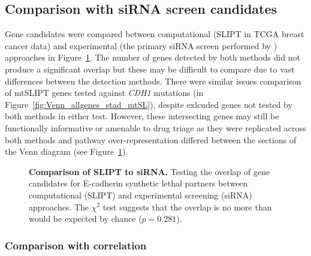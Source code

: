 \subsection{Comparison with siRNA screen candidates} \label{chapt3:primary_screen}

Gene candidates were compared between computational (\gls{SLIPT} in TCGA breast cancer data) and experimental (the primary \gls{siRNA} screen performed by \citet{Telford2015}) approaches in Figure~\ref{fig:Venn_allgenes}. The number of genes detected by both methods did not produce a significant overlap but these may be difficult to compare due to vast differences between the detection methods. There were similar issues comparison of mtSLIPT genes tested against \textit{CDH1} mutations (in Figure~\ref{fig:Venn_allgenes_stad_mtSL}), despite exlcuded genes not tested by both methods in either test. However, these intersecting genes may still be functionally informative or amenable to drug triage as they were replicated across both methods and pathway over-represent\-ation differed between the sections of the Venn diagram (see Figure~\ref{fig:Venn_allgenes}).

\begin{figure}[!ht]
\begin{mdframed}
  \centering
    \caption[Comparison of SLIPT to siRNA]{\small \textbf{Comparison of \gls{SLIPT} to \gls{siRNA}.} Testing the overlap of gene candidates for E-cadherin synthetic lethal partners between computational (\gls{SLIPT}) and experimental screening (\gls{siRNA}) approaches. The $\chi^2$ test suggests that the overlap is no more than would be expected by chance ($p = 0.281$). %
}
\label{fig:Venn_allgenes}
\end{mdframed}
\end{figure}


\FloatBarrier

\subsubsection{Comparison with correlation} \label{chapt3:compare_correlation} 

